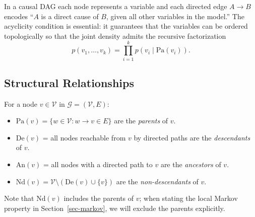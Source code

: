\documentclass[
  a4paper,
]{book}
\providecommand{\tightlist}{%
  \setlength{\itemsep}{0pt}\setlength{\parskip}{0pt}}
\newcommand{\Gcal}{\mathcal{G}}
\newcommand{\Pa}{\mathrm{Pa}}
\newcommand{\De}{\mathrm{De}}
\newcommand{\An}{\mathrm{An}}
\newcommand{\Nd}{\mathrm{Nd}}
\begin{document}
In a causal DAG each node represents a variable and each directed edge
\(A \to B\) encodes ``\(A\) is a direct cause of \(B\), given all other
variables in the model.'' The acyclicity condition is essential: it
guarantees that the variables can be ordered topologically so that the
joint density admits the recursive factorization
\[p(v_1,\dots,v_k) = \prod_{i=1}^{k} p(v_i \mid \Pa(v_i)).\]

\subsection{Structural Relationships}\label{structural-relationships}

\begin{tcolorbox}[enhanced jigsaw, arc=.35mm, bottomrule=.15mm, bottomtitle=1mm, breakable, colback=white, colbacktitle=quarto-callout-note-color!10!white, colframe=quarto-callout-note-color-frame, coltitle=black, left=2mm, leftrule=.75mm, opacityback=0, opacitybacktitle=0.6, rightrule=.15mm, title={Definition: Structural Relationships in a DAG}, titlerule=0mm, toprule=.15mm, toptitle=1mm]

For a node \(v \in \mathcal{V}\) in \(\Gcal = (\mathcal{V}, E)\):

\begin{itemize}
\tightlist
\item
  \(\Pa(v) = \{w \in \mathcal{V} : w \to v \in E\}\) are the
  \emph{parents} of \(v\).
\item
  \(\De(v)\) = all nodes reachable from \(v\) by directed paths are the
  \emph{descendants} of \(v\).
\item
  \(\An(v)\) = all nodes with a directed path to \(v\) are the
  \emph{ancestors} of \(v\).
\item
  \(\Nd(v) = \mathcal{V} \setminus (\De(v) \cup \{v\})\) are the
  \emph{non-descendants} of \(v\).
\end{itemize}

Note that \(\Nd(v)\) includes the parents of \(v\); when stating the
local Markov property in Section~\ref{sec-markov}, we will exclude the
parents explicitly.

\end{tcolorbox}
\end{document}

